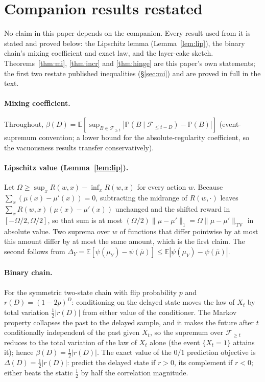 \documentclass[11pt]{article}
\newcommand{\TV}{\mathrm{TV}}
\newcommand{\E}{\mathbb{E}}
\begin{document}
\appendix
\section{Companion results restated}\label{app:companion}

No claim in this paper depends on the companion. Every result used from it
is stated and proved below: the Lipschitz lemma (Lemma~\ref{lem:lip}), the
binary chain's mixing coefficient and exact law, and the layer-cake sketch.
Theorems~\ref{thm:mi}, \ref{thm:incr} and \ref{thm:hinge} are this paper's own
statements; the first two restate published inequalities (\S\ref{sec:mi})
and are proved in full in the text.

\paragraph{Mixing coefficient.} Throughout,
$\beta(D)=\E[\sup_{B\in\mathcal F_{\ge t}}
|\mathbb P(B\mid\mathcal F_{\le t-D})-\mathbb P(B)|]$ (event-supremum
convention; a lower bound for the absolute-regularity coefficient, so the
vacuousness results transfer conservatively).

\paragraph{Lipschitz value (Lemma~\ref{lem:lip}).} Let $\Omega\ge\sup_x R(w,x)-\inf_x R(w,x)$ for
every action $w$. Because $\sum_x(\mu(x)-\mu'(x))=0$, subtracting the midrange
of $R(w,\cdot)$ leaves $\sum_x R(w,x)(\mu(x)-\mu'(x))$ unchanged and the
shifted reward in $[-\Omega/2,\Omega/2]$, so that sum is at most
$(\Omega/2)\|\mu-\mu'\|_1=\Omega\|\mu-\mu'\|_{\TV}$ in absolute value. Two
suprema over $w$ of functions that differ pointwise by at most this amount
differ by at most the same amount, which is the first claim. The second
follows from $\Delta_Y=\E[\psi(\mu_Y)-\psi(\bar\mu)]\le\E|\psi(\mu_Y)-\psi(\bar\mu)|$.

\paragraph{Binary chain.} For the symmetric two-state chain with flip
probability $p$ and $r(D)=(1-2p)^D$: conditioning on the delayed state
moves the law of $X_t$ by total variation $\tfrac12|r(D)|$ from either
value of the conditioner. The Markov property collapses the past to the
delayed sample, and it makes the future after $t$ conditionally independent
of the past given $X_t$, so the supremum over $\mathcal F_{\ge t}$
reduces to the total variation of the law of $X_t$ alone (the event
$\{X_t=1\}$ attains it); hence $\beta(D)=\tfrac12|r(D)|$. The exact value of the
$0/1$ prediction objective is $\Delta(D)=\tfrac12|r(D)|$: predict the
delayed state if $r>0$, its complement if $r<0$; either beats the static
$\tfrac12$ by half the correlation magnitude.
\end{document}
